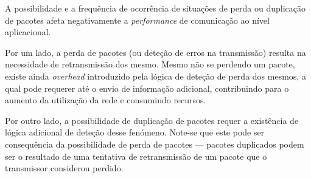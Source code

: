 

A possibilidade e a frequência de ocorrência de situações de perda ou duplicação de pacotes afeta negativamente a \emph{performance} de comunicação ao nível aplicacional. 

Por um lado, a perda de pacotes (ou deteção de erros na transmissão) resulta na necessidade de retransmissão dos mesmo. Mesmo não se perdendo um pacote, existe ainda \emph{overhead} introduzido pela lógica de deteção de perda dos mesmos, a qual pode requerer até o envio de informação adicional, contribuindo para o aumento da utilização da rede e consumindo recursos.

Por outro lado, a possibilidade de duplicação de pacotes requer a existência de lógica adicional de deteção desse fenómeno. Note-se que este pode ser consequência da possibilidade de perda de pacotes --- pacotes duplicados podem ser o resultado de uma tentativa de retransmissão de um pacote que o transmissor considerou perdido.

